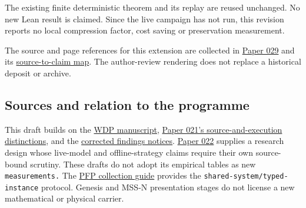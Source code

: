 \documentclass[
  11pt,
]{article}
\begin{document}
The existing finite deterministic theorem and its replay are reused
unchanged. No new Lean result is claimed. Since the live campaign has
not run, this revision reports no local compression factor, cost saving
or preservation measurement.

The source and page references for this extension are collected in
\href{../029/paper.pdf}{Paper 029} and its
\href{../029/docs/source_to_claim_map.md}{source-to-claim map}. The
author-review rendering does not replace a historical deposit or
archive.

\subsection{Sources and relation to the
programme}\label{sources-and-relation-to-the-programme}

This draft builds on the
\href{https://github.com/dbccpage/the_symbol_game/blob/59dde95a7860063c25d75db37f40af556e9f28ee/omega_engine_atlas/coda_atlas/F004_papers/001_finite_obstruction_calculus/000_witnessed_difference_programme/witnessed_difference_programme.md}{WDP
manuscript},
\href{https://github.com/dbccpage/the_symbol_game/blob/59dde95a7860063c25d75db37f40af556e9f28ee/omega_engine_atlas/coda_atlas/F004_papers/015_pfp/021_recreated_demos_and_proposal_fidelity_evidence/paper.md}{Paper
021's source-and-execution distinctions}, and the
\href{https://github.com/dbccpage/the_symbol_game/blob/59dde95a7860063c25d75db37f40af556e9f28ee/omega_engine_atlas/coda_atlas/F004_papers/015_pfp/symbol_game_challenge_and_demos_findings/README.md}{corrected
findings notices}.
\href{https://github.com/dbccpage/the_symbol_game/blob/59dde95a7860063c25d75db37f40af556e9f28ee/omega_engine_atlas/coda_atlas/F004_papers/015_pfp/022_pfp_frontier_research/paper.md}{Paper
022} supplies a research design whose live-model and offline-strategy
claims require their own source-bound scrutiny. These drafts do not
adopt its empirical tables as new \nolinkurl{measurements.} The
\href{https://github.com/dbccpage/the_symbol_game/blob/59dde95a7860063c25d75db37f40af556e9f28ee/omega_engine_atlas/coda_atlas/F004_papers/015_pfp/README.md}{PFP
collection guide} provides the \nolinkurl{shared-system/typed-instance}
protocol. Genesis and MSS-N presentation stages do not license a new
mathematical or physical carrier.
\end{document}
